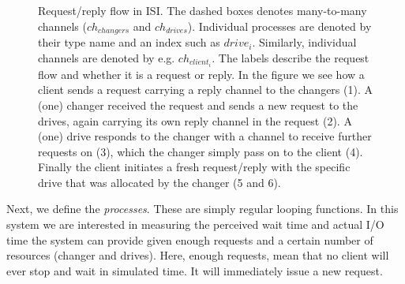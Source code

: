\begin{figure}[htb]
\caption{Request/reply flow in ISI. The dashed boxes denotes many-to-many
channels ($ch_{changers}$ and $ch_{drives}$). Individual processes are denoted
by their type name and an index such as $drive_i$. Similarly, individual
channels are denoted by e.g. $ch_{client_i}$. The labels describe the
request flow and whether it is a request or reply. In the figure we see how a
client sends a request carrying a reply channel to the changers (1). A (one)
changer received the request and sends a new request to the drives, again
carrying its own reply channel in the request (2). A (one) drive responds to
the changer with a channel to receive further requests on (3), which the
changer simply pass on to the client (4). Finally the client initiates a fresh
request/reply with the specific drive that was allocated by the changer (5 and
6).}
\label{reqresp-illustration}
\end{figure}


Next, we define the \emph{processes}. These are simply regular looping
functions. In this system we are interested in measuring the perceived wait
time and actual I/O time the system can provide given enough requests and a
certain number of resources (changer and drives). Here, enough requests, mean
that no client will ever stop and wait in simulated time. It will immediately
issue a new request.


